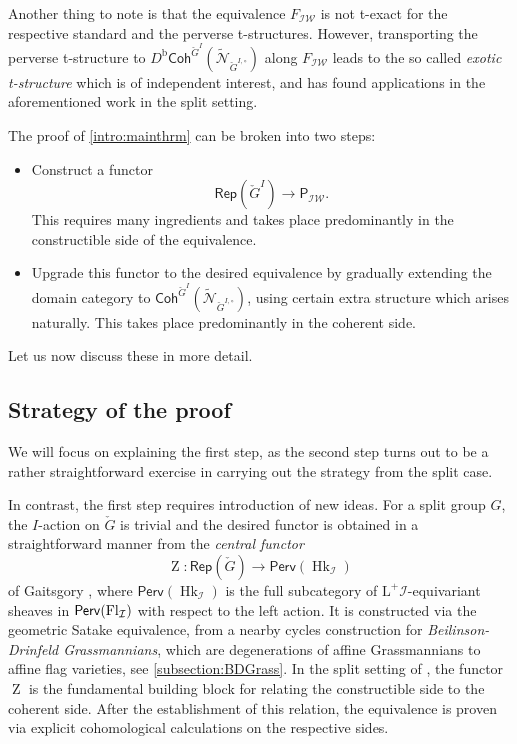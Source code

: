 \documentclass{amsart}
\newcommand{\Perv}{\mathsf{Perv}}
\newcommand{\Rep}{\mathsf{Rep}}
\newcommand{\Coh}{\mathsf{Coh}}
\newcommand{\Db}{D^{\mathrm{b}}}
\newcommand{\Hk}[1]{\ensuremath{\operatorname{Hk}_{#1}}}
\newcommand{\Zent}{\operatorname{Z}}
\newcommand{\Lplus}{\mathrm{L}^+}
\newcommand{\I}{\mathcal{I}}
\newcommand{\PIW}{\mathsf{P}_{\mathcal{IW}}}
\newcommand{\IW}{\mathcal{IW}}
\newcommand{\Sprgd}{\widetilde{\mathcal{N}}_{\check{G}^{I,\circ}}}
\newcommand{\Fl}[2][]{%
  \ifblank{#1}{
    \operatorname{Fl}_{#2}}
  {
    \operatorname{Fl}_{#1,#2}}}
\numberwithin{equation}{section}
\theoremstyle{definition}
\theoremstyle{remark}
\begin{document}
Another thing to note is that the equivalence $F_\IW$ is not t-exact for the respective standard and the perverse
t-structures. However, transporting the perverse t-structure to $\Db\Coh^{\check G^I}(\Sprgd)$ along $F_\IW$ leads to
the so called \textit{exotic t-structure} which is of independent interest, and has found applications in the
aforementioned work \cite{bezrukavnikovQuantum} in the split setting.

The proof of \cref{intro:mainthrm} can be broken into two steps:
\begin{itemize}
	\item[Step 1:]Construct a
		functor
$$\Rep(\check G^I)\rightarrow \PIW.$$
This requires many ingredients and takes place predominantly in the constructible side of the
equivalence.
\item[Step 2:]
		Upgrade this functor to the desired equivalence by gradually extending the domain category
		to $\Coh^{\check G^I}(\Sprgd)$, using certain extra structure which arises
		naturally. This takes place predominantly in the coherent side.
\end{itemize}
Let us now discuss these in more detail.
\subsection{Strategy of the proof}\label{intro:central}
We will focus on explaining the first step, as the second step turns out to be a rather
straightforward exercise in carrying out the strategy from the split case.

In contrast, the first step requires introduction of new ideas. For a split group $G$, the
$I$-action on $\check G$ is trivial and the desired functor is obtained in a straightforward
manner from the \textit{central functor}
$$\Zent:\Rep(\check G)\rightarrow \Perv(\Hk{\I})$$
of Gaitsgory \cite{gaitsgoryCentral}, where $\Perv(\Hk{\I})$ is the full subcategory of
$\Lplus\I$-equivariant sheaves in
$\Perv(\Fl{\I})$ with respect to the left action. It is constructed via the geometric Satake equivalence,
from a nearby cycles construction for
\textit{Beilinson-Drinfeld Grassmannians}, which are degenerations of affine Grassmannians to
affine flag varieties, see \cref{subsection:BDGrass}. In the split setting of
\cite{arkhipovBezrukavnikov}, the functor $\Zent$ is
the fundamental building block for relating the constructible side to the coherent side. After the
establishment of this relation, the equivalence is proven via explicit cohomological calculations on the
respective sides.
\end{document}

